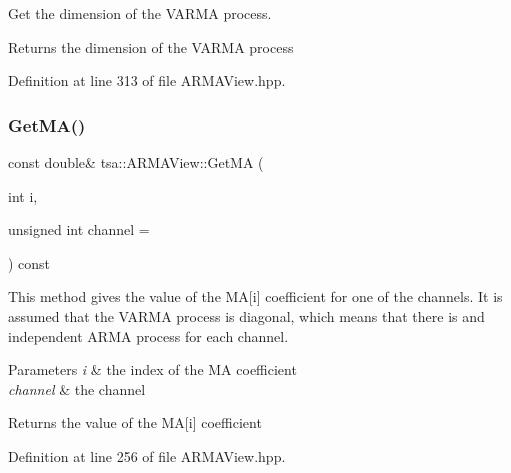 Get the dimension of the V\+A\+R\+MA process.

\begin{DoxyReturn}{Returns}
the dimension of the V\+A\+R\+MA process 
\end{DoxyReturn}


Definition at line 313 of file A\+R\+M\+A\+View.\+hpp.

\mbox{\label{classtsa_1_1_a_r_m_a_view_ad1f9e11168b5fb4c62ce4afb81ed0c86}} 
\subsubsection{\texorpdfstring{Get\+M\+A()}{GetMA()}}
{\footnotesize\ttfamily const double\& tsa\+::\+A\+R\+M\+A\+View\+::\+Get\+MA (\begin{DoxyParamCaption}\item[{int}]{i,  }\item[{unsigned int}]{channel = {} }\end{DoxyParamCaption}) const\hspace{0.3cm}{\ttfamily [inline]}}

This method gives the value of the MA\mbox{[}i\mbox{]} coefficient for one of the channels. It is assumed that the V\+A\+R\+MA process is diagonal, which means that there is and independent A\+R\+MA process for each channel.


\begin{DoxyParams}{Parameters}
{\em i} & the index of the MA coefficient \\
\hline
{\em channel} & the channel\\
\hline
\end{DoxyParams}
\begin{DoxyReturn}{Returns}
the value of the MA\mbox{[}i\mbox{]} coefficient 
\end{DoxyReturn}


Definition at line 256 of file A\+R\+M\+A\+View.\+hpp.

\mbox{\label{classtsa_1_1_a_r_m_a_view_a50b9c68a7cafc52b47a35b11301d3adb}} 
